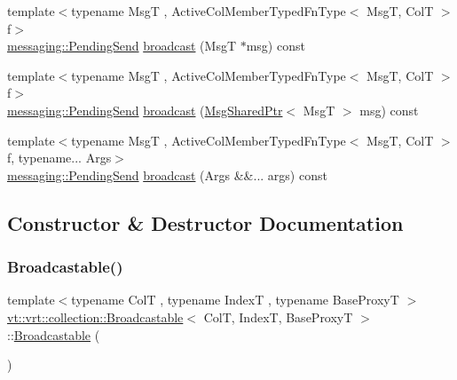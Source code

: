 \begin{DoxyCompactItemize}
\item 
{\footnotesize template$<$typename MsgT , Active\+Col\+Member\+Typed\+Fn\+Type$<$ Msg\+T, Col\+T $>$ f$>$ }\\\hyperlink{structvt_1_1messaging_1_1_pending_send}{messaging\+::\+Pending\+Send} \hyperlink{structvt_1_1vrt_1_1collection_1_1_broadcastable_a0a08e1ab7c78e36b3ecb5b6a4d399dab}{broadcast} (MsgT $\ast$msg) const
\item 
{\footnotesize template$<$typename MsgT , Active\+Col\+Member\+Typed\+Fn\+Type$<$ Msg\+T, Col\+T $>$ f$>$ }\\\hyperlink{structvt_1_1messaging_1_1_pending_send}{messaging\+::\+Pending\+Send} \hyperlink{structvt_1_1vrt_1_1collection_1_1_broadcastable_a84e88085c04b2293e019faf986a4996a}{broadcast} (\hyperlink{namespacevt_ab2b3d506ec8e8d1540aede826d84a239}{Msg\+Shared\+Ptr}$<$ MsgT $>$ msg) const
\item 
{\footnotesize template$<$typename MsgT , Active\+Col\+Member\+Typed\+Fn\+Type$<$ Msg\+T, Col\+T $>$ f, typename... Args$>$ }\\\hyperlink{structvt_1_1messaging_1_1_pending_send}{messaging\+::\+Pending\+Send} \hyperlink{structvt_1_1vrt_1_1collection_1_1_broadcastable_a96cd21a1be6313144a8c4aa3683eaa05}{broadcast} (Args \&\&... args) const
\end{DoxyCompactItemize}


\subsection{Constructor \& Destructor Documentation}
\mbox{\label{structvt_1_1vrt_1_1collection_1_1_broadcastable_afc16bdb399c4a846fd741062d995a339}} 
\subsubsection{\texorpdfstring{Broadcastable()}{Broadcastable()}\hspace{0.1cm}{\footnotesize\ttfamily [1/4]}}
{\footnotesize\ttfamily template$<$typename ColT , typename IndexT , typename Base\+ProxyT $>$ \\
\hyperlink{structvt_1_1vrt_1_1collection_1_1_broadcastable}{vt\+::vrt\+::collection\+::\+Broadcastable}$<$ ColT, IndexT, Base\+ProxyT $>$\+::\hyperlink{structvt_1_1vrt_1_1collection_1_1_broadcastable}{Broadcastable} (\begin{DoxyParamCaption}{ }\end{DoxyParamCaption})\hspace{0.3cm}{\ttfamily [default]}}


